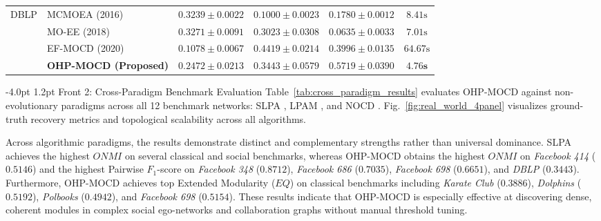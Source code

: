 \documentclass{svproc}
\makeatletter
\renewcommand\subsection{\@startsection{subsection}{2}{\z@}%
  {-4.0pt \@plus -0.5pt \@minus -0.5pt}%
  {1.2pt \@plus 0.5pt}%
  {\normalfont\normalsize\bfseries\boldmath}}
\makeatother
\begin{document}
\begin{table}[t]
{\begin{tabular}{@{}llcccc@{}}
\midrule
DBLP & MCMOEA (2016) & $0.3239 \pm 0.0022$ & $0.1000 \pm 0.0023$ & $0.1780 \pm 0.0012$ & $8.41\text{s}$ \\
 & MO-EE (2018) & $\mathbf{0.3271 \pm 0.0091}$ & $0.3023 \pm 0.0308$ & $0.0635 \pm 0.0033$ & $7.01\text{s}$ \\
 & EF-MOCD (2020) & $0.1078 \pm 0.0067$ & $\mathbf{0.4419 \pm 0.0214}$ & $0.3996 \pm 0.0135$ & $64.67\text{s}$ \\
 & \textbf{OHP-MOCD (Proposed)} & $0.2472 \pm 0.0213$ & $0.3443 \pm 0.0579$ & $\mathbf{0.5719 \pm 0.0390}$ & $\mathbf{4.76\text{s}}$ \\
\bottomrule
\end{tabular}%
}
\end{table}

\subsection{Front 2: Cross-Paradigm Benchmark Evaluation}\label{subsec:cross_paradigm}
Table~\ref{tab:cross_paradigm_results} evaluates OHP-MOCD against non-evolutionary paradigms across all 12 benchmark networks: SLPA \cite{xie2011}, LPAM \cite{ponomarenko2021}, and NOCD \cite{shchur2019}. Fig.~\ref{fig:real_world_4panel} visualizes ground-truth recovery metrics and topological scalability across all algorithms.

Across algorithmic paradigms, the results demonstrate distinct and complementary strengths rather than universal dominance. SLPA achieves the highest $ONMI$ on several classical and social benchmarks, whereas OHP-MOCD obtains the highest $ONMI$ on \textit{Facebook 414} ($0.5146$) and the highest Pairwise $F_1$-score on \textit{Facebook 348} ($0.8712$), \textit{Facebook 686} ($0.7035$), \textit{Facebook 698} ($0.6651$), and \textit{DBLP} ($0.3443$). Furthermore, OHP-MOCD achieves top Extended Modularity ($EQ$) on classical benchmarks including \textit{Karate Club} ($0.3886$), \textit{Dolphins} ($0.5192$), \textit{Polbooks} ($0.4942$), and \textit{Facebook 698} ($0.5154$). These results indicate that OHP-MOCD is especially effective at discovering dense, coherent modules in complex social ego-networks and collaboration graphs without manual threshold tuning.
\end{document}
